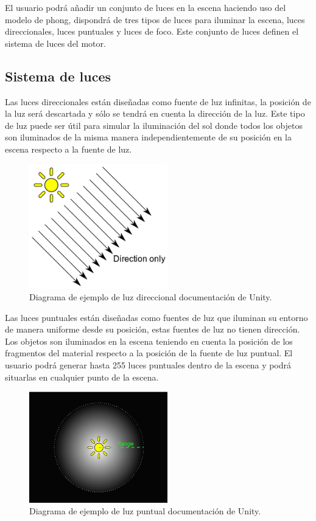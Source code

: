 \documentclass[a4paper]{book}
\begin{document}
El usuario podrá añadir un conjunto de luces en la escena haciendo uso del modelo de phong, dispondrá de tres tipos de luces para
iluminar la escena, luces direccionales, luces puntuales y luces de foco. Este conjunto de luces definen el sistema de luces del motor.

\subsection{Sistema de luces}
\label{sec:Luces}

Las luces direccionales están diseñadas como fuente de luz infinitas, la posición de la luz será descartada y sólo se tendrá en cuenta
la dirección de la luz. Este tipo de luz puede ser útil para simular la iluminación del sol donde todos los objetos son iluminados de
la misma manera independientemente de su posición en la escena respecto a la fuente de luz.

\begin{figure}[H]
    \centering
    \includegraphics[width=6cm, keepaspectratio]{img/DirectionalLightDiagram.png}
    \caption{ Diagrama de ejemplo de luz direccional documentación de Unity.}
    \label{DirectionalLightDiagram}
\end{figure}

Las luces puntuales están diseñadas como fuentes de luz que iluminan su entorno de manera uniforme desde su posición, estas fuentes de
luz no tienen dirección. Los objetos son iluminados en la escena teniendo en cuenta la posición de los fragmentos del material respecto
a la posición de la fuente de luz puntual. El usuario podrá generar hasta 255 luces puntuales dentro de la escena y podrá situarlas en
cualquier punto de la escena.

\begin{figure}[H]
    \centering
    \includegraphics[width=6cm, keepaspectratio]{img/PointLightDiagram.png}
    \caption{Diagrama de ejemplo de luz puntual documentación de Unity.}
    \label{PointLightDiagram}
\end{figure}
\end{document}
